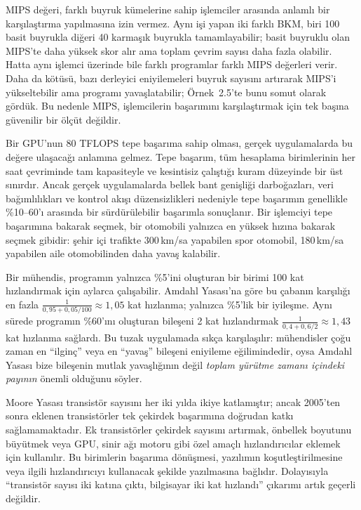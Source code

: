 MIPS değeri, farklı buyruk kümelerine sahip işlemciler arasında anlamlı bir karşılaştırma yapılmasına izin vermez. Aynı işi yapan iki farklı BKM, biri 100 basit buyrukla diğeri 40 karmaşık buyrukla tamamlayabilir; basit buyruklu olan MIPS'te daha yüksek skor alır ama toplam çevrim sayısı daha fazla olabilir. Hatta aynı işlemci üzerinde bile farklı programlar farklı MIPS değerleri verir. Daha da kötüsü, bazı derleyici eniyilemeleri buyruk sayısını artırarak MIPS'i yükseltebilir ama programı yavaşlatabilir; Örnek~2.5'te bunu somut olarak gördük. Bu nedenle MIPS, işlemcilerin başarımını karşılaştırmak için tek başına güvenilir bir ölçüt değildir.

Bir GPU'nun 80 TFLOPS tepe başarıma sahip olması, gerçek uygulamalarda bu değere ulaşacağı anlamına gelmez. Tepe başarım, tüm hesaplama birimlerinin her saat çevriminde tam kapasiteyle ve kesintisiz çalıştığı kuram düzeyinde bir üst sınırdır. Ancak gerçek uygulamalarda bellek bant genişliği darboğazları, veri bağımlılıkları ve kontrol akışı düzensizlikleri nedeniyle tepe başarımın genellikle \%10--60'ı arasında bir sürdürülebilir başarımla sonuçlanır. Bir işlemciyi tepe başarımına bakarak seçmek, bir otomobili yalnızca en yüksek hızına bakarak seçmek gibidir: şehir içi trafikte 300\,km/sa yapabilen spor otomobil, 180\,km/sa yapabilen aile otomobilinden daha yavaş kalabilir.

Bir mühendis, programın yalnızca \%5'ini oluşturan bir birimi 100 kat hızlandırmak için aylarca çalışabilir. Amdahl Yasası'na göre bu çabanın karşılığı en fazla $\frac{1}{0{,}95 + 0{,}05/100} \approx 1{,}05$ kat hızlanma; yalnızca \%5'lik bir iyileşme. Aynı sürede programın \%60'ını oluşturan bileşeni 2 kat hızlandırmak $\frac{1}{0{,}4 + 0{,}6/2} \approx 1{,}43$ kat hızlanma sağlardı. Bu tuzak uygulamada sıkça karşılaşılır: mühendisler çoğu zaman en ``ilginç'' veya en ``yavaş'' bileşeni eniyileme eğilimindedir, oysa Amdahl Yasası bize bileşenin mutlak yavaşlığının değil \emph{toplam yürütme zamanı içindeki payının} önemli olduğunu söyler.

Moore Yasası transistör sayısını her iki yılda ikiye katlamıştır; ancak 2005'ten sonra eklenen transistörler tek çekirdek başarımına doğrudan katkı sağlamamaktadır. Ek transistörler çekirdek sayısını artırmak, önbellek boyutunu büyütmek veya GPU, sinir ağı motoru gibi özel amaçlı hızlandırıcılar eklemek için kullanılır. Bu birimlerin başarıma dönüşmesi, yazılımın koşutleştirilmesine veya ilgili hızlandırıcıyı kullanacak şekilde yazılmasına bağlıdır. Dolayısıyla ``transistör sayısı iki katına çıktı, bilgisayar iki kat hızlandı'' çıkarımı artık geçerli değildir.

